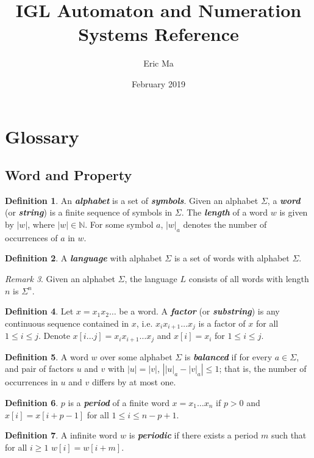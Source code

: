 \documentclass{article}
\title{IGL Automaton and Numeration Systems Reference}
\author{Eric Ma}
\date{February 2019}
\theoremstyle{definition}
\newtheorem{definition}{Definition}[section]
\theoremstyle{remark}
\newtheorem{remark}[definition]{Remark}
\theoremstyle{remark}
\theoremstyle{plain}
\theoremstyle{definition}
\newcommand{\term}[1]{\emph{\textbf{#1}}}
\begin{document}
\maketitle

\section{Glossary}
\subsection{Word and Property}
\begin{definition}
An \term{alphabet} is a set of \term{symbols}. Given an alphabet $\Sigma$, a \term{word} (or \term{string}) is a finite sequence of symbols in $\Sigma$. The \term{length} of a word $w$ is given by $|w|$, where $|w| \in \mathbb{N}$. For some symbol $a$, $|w|_a$ denotes the number of occurrences of $a$ in $w$.
\end{definition}

\begin{definition}
A \term{language} with alphabet $\Sigma$ is a set of words with alphabet $\Sigma$. 
\end{definition}
\begin{remark}
Given an alphabet $\Sigma$, the language $L$ consists of all words with length $n$ is $\Sigma^n$.
\end{remark}
\begin{definition}
Let $x=x_1x_2\dots $ be a word. A \term{factor} (or \term{substring}) is any continuous sequence contained in $x$, i.e. $x_ix_{i+1}\dots x_j$ is a factor of $x$ for all $1\le i\le j$. Denote $x[i\dots j] = x_ix_{i+1}\dots x_j$ and $x[i] = x_i$ for $1\le i\le j $.
\end{definition}

\begin{definition}
A word $w$ over some alphabet $\Sigma$ is \term{balanced} if for every $a \in \Sigma$, and pair of factors $u$ and $v$ with $|u| = |v|$, $\left||u|_a - |v|_a\right| \leq 1$; that is, the number of occurrences in $u$ and $v$ differs by at most one.
\end{definition}

\begin{definition}
$p$ is a \term{period} of a finite word $x = x_1\dots x_n$ if $p > 0$ and $x[i] = x[i+p-1]$ for all $1\le i \le n-p+1$. 
\end{definition}

\begin{definition}
A infinite word $w$ is \term{periodic} if there exists a period $m$ such that for all $i\ge 1$ $w[i] = w[i+m]$.
\end{definition}
\end{document}
